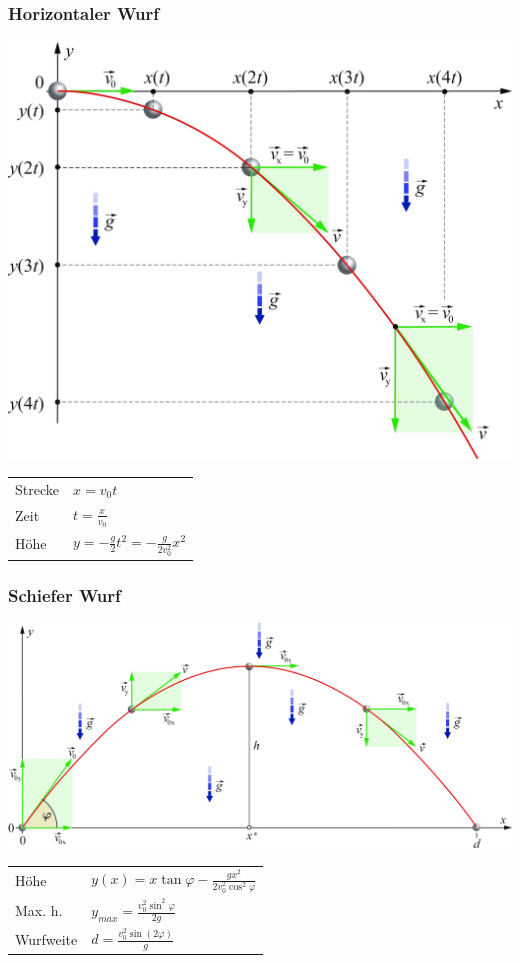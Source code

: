 \documentclass[a4paper]{scrartcl}
\begin{document}
\subsubsection{Horizontaler Wurf}
	\begin{multicols}{2}
		\includegraphics[width=\linewidth]{img/wurf_horizontal}
		
		\begin{tabu} {l X}
			Strecke & $x = v_0 t$ \\
			Zeit & $t = \frac{x}{v_0}$ \\
			Höhe & $y = - \frac{g}{2}t^2 = - \frac{g}{2v^2_0} x^2$
		\end{tabu}
	\end{multicols}

\subsubsection{Schiefer Wurf}
	\begin{multicols}{2}
		\includegraphics[width=\linewidth]{img/wurf_schief}

		\begin{tabu} {l X}
			Höhe & $y(x) = x \tan \varphi - \frac{g x^2}{2 v^2_0 \cos^2 \varphi}$ \\
			Max. h. & $y_{max} = \frac{v^2_0 \sin^2 \varphi}{2g}$ \\
			Wurfweite & $d = \frac{v^2_0 \sin(2\varphi)}{g}$
		\end{tabu}
	\end{multicols}
\end{document}
